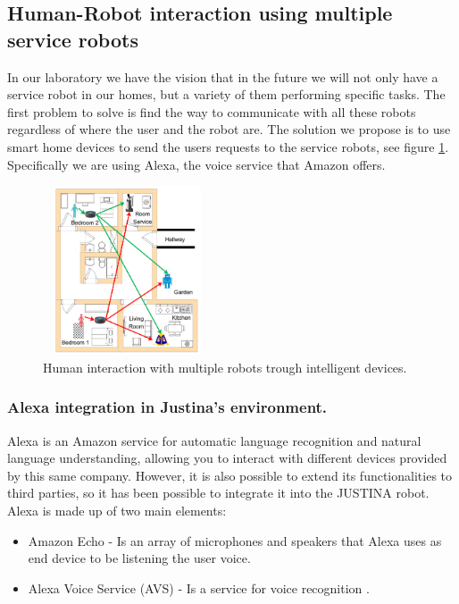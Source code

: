 \documentclass{llncs}
\begin{document}
\subsection{Human-Robot interaction using multiple service robots}\label{subsec:Alexa}

In our laboratory we have the vision that in the future we will not only have a service robot in our homes, 
but a variety of them performing specific tasks. The first problem to solve is find the way to communicate with all these robots regardless of where the user and the robot are.
The solution we propose is to use smart home devices to send the users requests to the service robots, see figure \ref{fig:alexahome}. 
Specifically we are using Alexa, 
the voice service that Amazon offers.

\begin{figure}[h]
	\centering
	\includegraphics[angle=0, height=5cm, width=5cm]{Figures/alexa1.png}
	\caption{Human interaction with multiple robots trough intelligent devices.}
	\label{fig:alexahome}
\end{figure}

\subsubsection{Alexa integration in Justina's environment.} Alexa is an Amazon service for automatic language recognition and natural language understanding, allowing you to interact with different devices provided by this same company. However, it is also possible to extend its functionalities to third parties, so it has been possible to integrate it into the JUSTINA robot. Alexa is made up of two main elements:
\begin{itemize}
	 \item Amazon Echo - Is an array of microphones and speakers that Alexa uses as end device to be listening the user voice.
	 \item Alexa Voice Service (AVS) - Is a service for voice recognition \cite{avs}.
\end{itemize}
\end{document}
